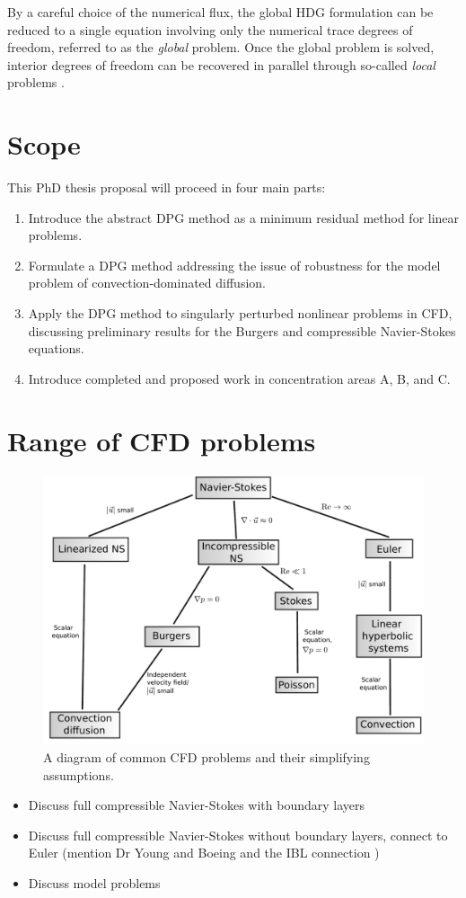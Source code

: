 By a careful choice of the numerical flux, the global HDG formulation can be reduced to a single equation involving only the numerical trace degrees of freedom, referred to as the \emph{global} problem. Once the global problem is solved, interior degrees of freedom can be recovered in parallel through so-called \emph{local} problems \cite{HDGprojection}. 

\section{Scope}

This PhD thesis proposal will proceed in four main parts:
\begin{enumerate}
\item Introduce the abstract DPG method as a minimum residual method for linear problems.
\item Formulate a DPG method addressing the issue of robustness for the model problem of convection-dominated diffusion.
\item Apply the DPG method to singularly perturbed nonlinear problems in CFD, discussing preliminary results for the Burgers and compressible Navier-Stokes equations. 
\item Introduce completed and proposed work in concentration areas A, B, and C. 
\end{enumerate}



\section{Range of CFD problems}

\begin{figure}[!h]
\centering
\includegraphics[scale=.45]{figs/CFD_tree.pdf}
\caption{A diagram of common CFD problems and their simplifying assumptions.}
\end{figure}

\begin{itemize}
\item Discuss full compressible Navier-Stokes with boundary layers
\item Discuss full compressible Navier-Stokes without boundary layers, connect to Euler (mention Dr Young and Boeing and the IBL connection \cite{BoeingDrela})
\item Discuss model problems
\end{itemize}
